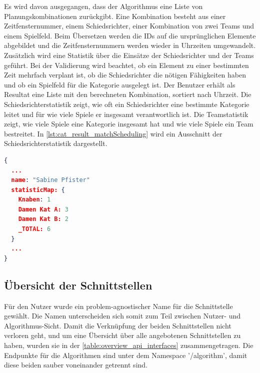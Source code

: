 Es wird davon ausgegangen, dass der Algorithmus eine Liste von Planungskombinationen zurückgibt. Eine Kombination besteht aus einer Zeitfensternummer, einem Schiedsrichter, 
einer Kombination von zwei Teams und einem Spielfeld. Beim Übersetzen werden die IDs auf die ursprünglichen Elemente abgebildet und die Zeitfensternummern werden wieder in Uhrzeiten 
umgewandelt. Zusätzlich wird eine Statistik über die Einsätze der Schiedsrichter und der Teams geführt. Bei der Validierung wird beachtet, ob ein Element zu einer 
bestimmten Zeit mehrfach verplant ist, ob die Schiedsrichter die nötigen Fähigkeiten haben und ob ein Spielfeld für die Kategorie ausgelegt ist. Der Benutzer erhält als Resultat eine Liste 
mit den berechneten Kombination, sortiert nach Uhrzeit. Die Schiedsrichterstatistik zeigt, wie oft ein Schiedsrichter eine bestimmte Kategorie leitet und für wie viele Spiele er insgesamt 
verantwortlich ist. Die Teamstatistik zeigt, wie viele Spiele eine Kategorie insgesamt hat und wie viele Spiele ein Team bestreitet. In \autoref{lst:cat_result_matchScheduling} wird ein 
Ausschnitt der Schiedsrichterstatistik dargestellt.

\begin{lstlisting}[language=JSON, caption=Ausschnitt eines Resultats einer Spielplan Erstellung, label=lst:cat_result_matchScheduling]  
{
  ...
  name: "Sabine Pfister"
  statisticMap: {
    Knaben: 1
    Damen Kat A: 3
    Damen Kat B: 2
    _TOTAL: 6
  }
  ...
}
\end{lstlisting}

\newpage

\subsection{Übersicht der Schnittstellen}
Für den Nutzer wurde ein problem-agnostischer Name für die Schnittstelle gewählt. Die Namen unterscheiden sich somit zum Teil zwischen Nutzer- und Algorithmus-Sicht. Damit die 
Verknüpfung der beiden Schnittstellen nicht verloren geht, und um eine Übersicht über alle angebotenen Schnittstellen zu haben, wurden sie in der \autoref{table:overview_api_interfaces} 
zusammengetragen. Die Endpunkte für die Algorithmen sind unter dem Namespace '/algorithm', damit diese beiden sauber voneinander getrennt sind.


